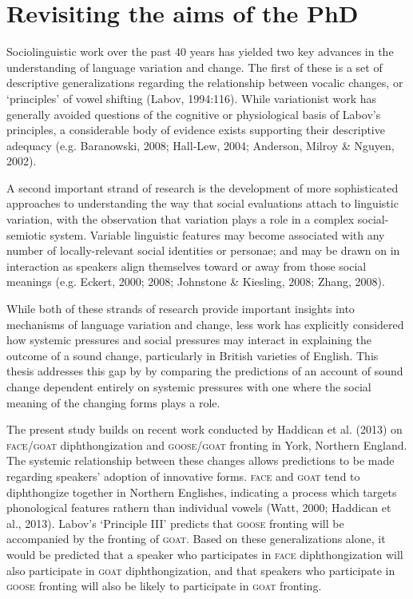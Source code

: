 \documentclass{article}
\begin{document}
\date{}
\section*{Revisiting the aims of the PhD}

Sociolinguistic work over the past 40 years has yielded two key advances in the understanding of language variation and change. The first of these is a set of descriptive generalizations regarding the relationship between vocalic changes, or `principles' of vowel shifting (Labov, 1994:116). While variationist work has generally avoided questions of the cognitive or physiological basis of Labov's principles, a considerable body of evidence exists supporting their descriptive adequacy (e.g. Baranowski, 2008; Hall-Lew, 2004; Anderson, Milroy \& Nguyen, 2002). 

A second important strand of research is the development of more sophisticated approaches to understanding the way that social evaluations attach to linguistic variation, with the observation that variation plays a role in a complex social-semiotic system. Variable linguistic features may become associated with any number of locally-relevant social identities or personae; and may be drawn on in interaction as speakers align themselves toward or away from those social meanings (e.g. Eckert, 2000; 2008; Johnstone \& Kiesling, 2008; Zhang, 2008).  

While both of these strands of research provide important insights into mechanisms of language variation and change, less work has explicitly considered how systemic pressures and social pressures may interact in explaining the outcome of a sound change, particularly in British varieties of English. This thesis addresses this gap by by  comparing the predictions of an account of sound change dependent entirely on systemic pressures with one where the social meaning of the changing forms plays a role.

The present study builds on recent work conducted by Haddican et al. (2013) on \textsc{face/goat} diphthongization and \textsc{goose/goat} fronting in York, Northern England. The systemic relationship between these changes allows predictions to be made regarding speakers' adoption of innovative forms. \textsc{face} and \textsc{goat} tend to diphthongize together in Northern Englishes, indicating a process which targets phonological features rathern than individual vowels (Watt, 2000; Haddican et al., 2013). Labov's `Principle III' predicts that \textsc{goose} fronting will be accompanied by the fronting of \textsc{goat}. Based on these generalizations alone, it would be predicted that a speaker who participates in \textsc{face} diphthongization will also participate in \textsc{goat} diphthongization, and that speakers who participate in \textsc{goose} fronting will also be likely to participate in \textsc{goat} fronting. 
\end{document}
